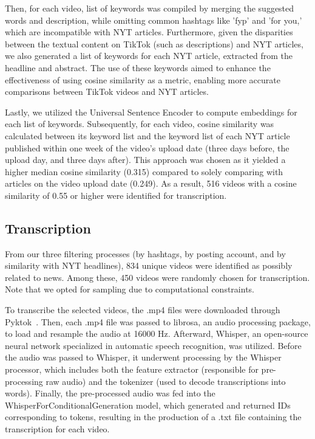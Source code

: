 \documentclass{article}
\begin{document}
{\noindent}Then, for each video, list of keywords was compiled by merging the suggested words and description, while omitting common hashtags like 'fyp' and 'for you,' which are incompatible with NYT articles. Furthermore, given the disparities between the textual content on TikTok (such as descriptions) and NYT articles, we also generated a list of keywords for each NYT article, extracted from the headline and abstract. The use of these keywords aimed to enhance the effectiveness of using cosine similarity as a metric, enabling more accurate comparisons between TikTok videos and NYT articles. \newline

{\noindent}Lastly, we utilized the Universal Sentence Encoder to compute embeddings for each list of keywords. Subsequently, for each video, cosine similarity was calculated between its keyword list and the keyword list of each NYT article published within one week of the video's upload date (three days before, the upload day, and three days after). This approach was chosen as it yielded a higher median cosine similarity (0.315) compared to solely comparing with articles on the video upload date (0.249). As a result, 516 videos with a cosine similarity of 0.55 or higher were identified for transcription.

\subsection{Transcription}
From our three filtering processes (by hashtags, by posting account, and by similarity with NYT headlines), 834 unique videos were identified as possibly related to news. Among these, 450 videos were randomly chosen for transcription. Note that we opted for sampling due to computational constraints. \newline

{\noindent}To transcribe the selected videos, the .mp4 files were downloaded through Pyktok~\cite{pyktok}. Then, each .mp4 file was passed to librosa, an audio processing package, to load and resample the audio at 16000 Hz. Afterward, Whisper, an open-source neural network specialized in automatic speech recognition, was utilized. Before the audio was passed to Whisper, it underwent processing by the Whisper processor, which includes both the feature extractor (responsible for pre-processing raw audio) and the tokenizer (used to decode transcriptions into words). Finally, the pre-processed audio was fed into the WhisperForConditionalGeneration model, which generated and returned IDs corresponding to tokens, resulting in the production of a .txt file containing the transcription for each video.\newline
\end{document}
